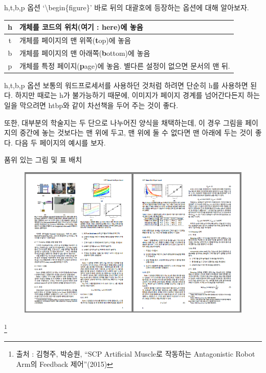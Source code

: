 \documentclass[12pt]{beamer}
\begin{document}
\begin{frame}{h,t,b,p 옵션}
	`\textbackslash begin\{figure\}' 바로 뒤의 대괄호에 등장하는 옵션에 대해 알아보자.
	\begin{table}
		\centering
		\begin{tabular}{|c|p{}|}
			\hline
			h & 개체를 코드의 위치(여기 : \textbf{h}ere)에 놓음 \\
			\hline
			t & 개체를 페이지의 맨 위쪽(\textbf{t}op)에 놓음 \\
			\hline
			b & 개체를 페이지의 맨 아래쪽(\textbf{b}ottom)에 놓음 \\
			\hline
			p & 개체를 특정 페이지(\textbf{p}age)에 놓음. 별다른  설정이 없으면 문서의 맨 뒤. \\
			\hline
		\end{tabular}
	\end{table}
\end{frame}
\begin{frame}{h,t,b,p 옵션}
	보통의 워드프로세서를 사용하던 것처럼 하려면 단순히 h를 사용하면 된다. 하지만 때로는 h가 불가능하기 때문에, 이미지가 페이지 경계를 넘어간다든지 하는 일을 막으려면 htbp와 같이 차선책을 두어 주는 것이 좋다.
	
	또한, 대부분의 학술지는 두 단으로 나누어진 양식을 채택하는데, 이 경우 그림을 페이지의 중간에 놓는 것보다는 맨 위에 두고, 맨 위에 둘 수 없다면 맨 아래에 두는 것이 좋다. 다음 두 페이지의 예시를 보자.
\end{frame}
\begin{frame}{품위 있는 그림 및 표 배치}
	\begin{figure}[h]
		\centering
		\includegraphics[width=.9\textwidth]{right_fig.png}
	\end{figure}
	\footnote{출처 : 김형주, 박승원, ``SCP Artificial Muscle로 작동하는 Antagonistic Robot Arm의 Feedback 제어''(2015)}
\end{frame}
\end{document}
